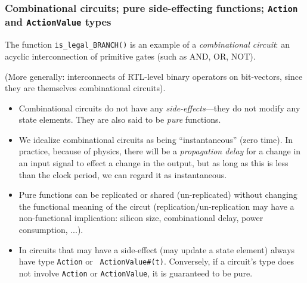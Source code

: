 \begin{frame}[fragile]
\frametitle{Combinational circuits; pure {\vs} side-effecting functions; {\tt Action} and {\tt ActionValue} types}

\footnotesize

The function {\tt is\_legal\_BRANCH()} is an example of a
\emph{combinational circuit}: an acyclic interconnection of primitive
gates (such as AND, OR, NOT).

\vspace{1ex}

(More generally: interconnects of RTL-level binary operators on
bit-vectors, since they are themselves combinational circuits).

\vfill

\begin{itemize}

 \item Combinational circuits do not have any
       \emph{side-effects}---they do not modify any state elements.
       They are also said to be \emph{pure} functions.

 \item We idealize combinational circuits as being ``instantaneous''
       (zero time).  In practice, because of physics, there will be a
       \emph{propagation delay} for a change in an input signal to
       effect a change in the output, but as long as this is less than
       the clock period, we can regard it as instantaneous.

 \item Pure functions can be replicated or shared (un-replicated)
       without changing the functional meaning of the circut
       (replication/un-replication may have a non-functional
       implication: silicon size, combinational delay, power
       consumption, ...).

 \item In {\BSV} circuits that may have a side-effect (may update a
       state element) always have type {\tt Action} or {\tt
       ActionValue\#(t)}.  Conversely, if a circuit's type does not
       involve {\tt Action} or {\tt ActionValue}, it is guaranteed to
       be pure.

\end{itemize}

\end{frame}


